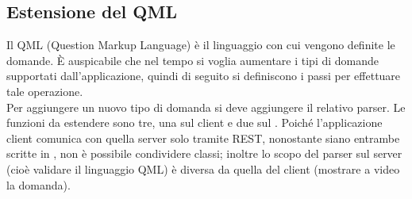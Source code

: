 \documentclass[12pt,a4paper]{article}
\begin{document}
	\subsection{Estensione del QML}
	Il QML (Question Markup Language) è il linguaggio con cui vengono definite le domande. È auspicabile che nel tempo si voglia aumentare i tipi di domande supportati dall’applicazione, quindi di seguito si definiscono i passi per effettuare tale operazione.\\
	Per aggiungere un  nuovo tipo di domanda si deve aggiungere il relativo parser. Le funzioni da estendere sono tre, una sul client e due sul . Poiché l’applicazione client comunica con quella server solo tramite  REST, nonostante siano entrambe scritte in , non è possibile condividere classi; inoltre lo scopo del parser sul server (cioè validare il linguaggio QML) è diversa da quella del client (mostrare a video la domanda).
\end{document}

